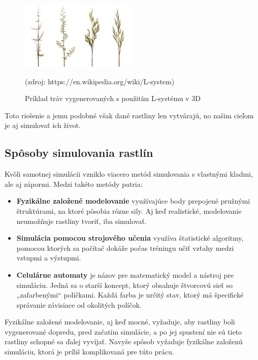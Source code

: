 \documentclass[12pt]{article}
\begin{document}
\begin{figure}[ht]
	\centering
	\includegraphics[width=0.5\textwidth]{res/Fractal_weeds.png}
	\caption{Príklad tráv vygenerovaných s použitím L-systému v 3D}

	\footnotesize (zdroj: https://en.wikipedia.org/wiki/L-system)

	\label{obr:priklad l-systemu}
\end{figure}

Toto riešenie a jemu podobné však dané rastliny len vytvárajú, no našim cieľom
je aj simulovať ich život.


\subsection{Spôsoby simulovania rastlín}

Kvôli samotnej simulácii vzniklo viacero metód simulovania s vlastnými kladmi,
ale aj zápormi. Medzi takéto metódy patria:

\begin{itemize}
	\item \textbf{Fyzikálne založené modelovanie} využívajúce body prepojené
	      pružnými štruktúrami, na ktoré pôsobia rôzne sily. Aj keď realistické,
	      modelovanie neumožňuje rastliny tvoriť, iba simulovať.
	\item \textbf{Simulácia pomocou strojového učenia} \cite{wiki:Machine_learning}
	      využíva štatistické
	      algoritmy, pomocou ktorých sa počítač dokáže počas tréningu učiť vzťahy medzi
	      vstupmi a výstupmi.
	\item \textbf{Celulárne automaty} \cite{wiki:Cellular_automaton}
	      je názov pre matematický model a nástroj pre simuláciu. Jedná sa
	      o starší koncept, ktorý obsahuje štvorcovú sieť so „zafarbenými“
	      políčkami. Každá farba je určitý stav, ktorý má špecifické správanie
	      závisiace od okolitých políčok.
\end{itemize}

Fyzikálne založené modelovanie, aj keď mocné, vyžaduje, aby rastliny boli
vygenerované dopredu, pred začatím simulácie, a po jej spustení nie sú tieto
rastliny schopné sa ďalej vyvíjať. Navyše spôsob vyžaduje fyzikálne založenú
simuláciu, ktorá je príliš komplikovaná pre túto prácu.
\end{document}
